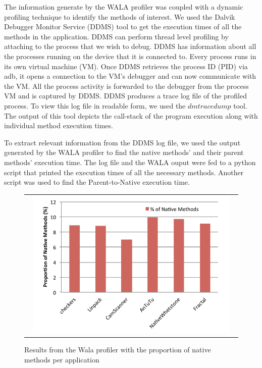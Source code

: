 The information generate by the WALA profiler was coupled with a dynamic profiling technique to identify the methods of interest.
We used the Dalvik Debugger Monitor Service (DDMS) tool to get the execution times of all the methods in the application. DDMS can perform
thread level profiling by attaching to the process that we wish to debug. DDMS has information about all the processes running on the device
that it is connected to. Every process runs in its own virtual machine (VM). Once DDMS retrieves the process ID (PID) via adb, it opens a
connection to the VM's debugger and can now communicate with the VM. All the process activity is forwarded to the debugger from the process VM
and is captured by DDMS. DDMS produces a trace log file of the profiled process. To view this log file in readable form, we used the
$dmtracedump$ tool. The output of this tool depicts the call-stack of the program execution along with individual method execution times.

To extract relevant information from the DDMS log file, we used the output generated by the WALA profiler to find the native methods' and their
parent methods' execution time. The log file and the WALA ouput were fed to a python script that printed the execution times of all the
necessary methods. Another script was used to find the Parent-to-Native execution time.

\begin{figure} [thf*]
\centering
\begin{tabular}{c}
\begin{minipage}[b]{0.5\textwidth}
\includegraphics[width=0.95\textwidth]{figs/native_total.pdf}
\end{minipage}
\end{tabular}
\caption{Results from the Wala profiler with the proportion of native methods per application}
\label{fig:native_total}
\end{figure}

